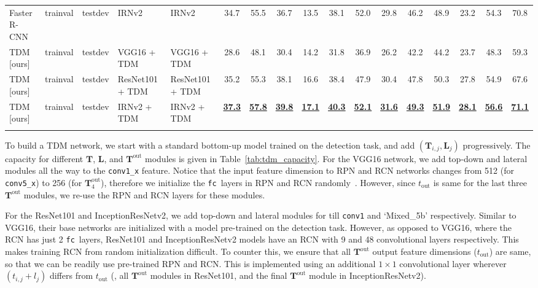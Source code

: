 \documentclass[10pt,twocolumn,letterpaper]{article}
\newcommand{\vv}[1]{{\texttt{#1}}}
\newcommand{\conv}{\vv{conv}}
\newcommand{\fc}{\vv{fc}}
\newcommand{\hl}[1]{\underline{\textbf{#1}}}
\begin{document}
\begin{table*}[th]
{\begin{tabular}{
@{}o{2.7cm} o{1.3cm} o{1.3cm} o{2.5cm} o{2.5cm} 
!{\color{gray}\vrule} ccc
!{\color{gray}\vrule} ccc
!{\color{gray}\vrule} ccc
!{\color{gray}\vrule} ccc
@{}}
Faster R-CNN & trainval\raisebox{0.2ex}{$\ast$} & testdev & IRNv2 & IRNv2 & 34.7 & 55.5 & 36.7 & 13.5 & 38.1 & 52.0 & 29.8 & 46.2 & 48.9 & 23.2 & 54.3 & 70.8 \\
\Xhline{1pt}
TDM [ours]  & trainval\raisebox{0.2ex}{$\ast$} & testdev & VGG16 + TDM & VGG16 + TDM & 28.6 &  48.1 &  30.4 &  14.2 &  31.8 &  36.9 &  26.2 &  42.2 &  44.2 &  23.7 &  48.3 &  59.3 \\
TDM [ours]  & trainval\raisebox{0.2ex}{$\ast$} & testdev & ResNet101 + TDM & ResNet101 + TDM & 35.2 & 55.3 & 38.1 & 16.6 & 38.4 & 47.9 & 30.4 & 47.8 & 50.3 & 27.8 & 54.9 & 67.6 \\
TDM [ours]  & trainval\raisebox{0.2ex}{$\ast$} & testdev & IRNv2 + TDM & IRNv2 + TDM & \hl{37.3} & \hl{57.8} & \hl{39.8} & \hl{17.1} & \hl{40.3} & \hl{52.1} & \hl{31.6} & \hl{49.3} & \hl{51.9} & \hl{28.1} & \hl{56.6} & \hl{71.1} \\
\Xhline{1pt}
\end{tabular}
}
\vspace{-0.11in}
\label{tab:coco_pref}
\end{table*}


To build a TDM network, we start with a standard bottom-up model trained on the detection task, and add $\left(\mathbf{T}_{i,j}, \mathbf{L}_j\right)$ progressively. The capacity for different $\mathbf{T}$, $\mathbf{L}$, and $\mathbf{T}^\text{out}$ modules is given in Table~\ref{tab:tdm_capacity}. For the VGG16 network, we add top-down and lateral modules all the way to the \conv\verb|1_x| feature. Notice that the input feature dimension to RPN and RCN networks changes from 512 (for \conv\verb|5_x|) to 256 (for $\mathbf{T}^\text{out}_{4}$), therefore we initialize the \fc\ layers in RPN and RCN randomly~\cite{xavier}. However, since $t_\text{out}$ is same for the last three $\mathbf{T}^\text{out}$ modules, we re-use the RPN and RCN layers for these modules.

For the ResNet101 and InceptionResNetv2, we add top-down and lateral modules for till \conv\verb|1| and `Mixed\_5b' respectively. Similar to VGG16, their base networks are initialized with a model pre-trained on the detection task. However, as opposed to VGG16, where the RCN has just 2 \fc\ layers, ResNet101 and InceptionResNetv2 models have an RCN with 9 and 48 convolutional layers respectively. This makes training RCN from random initialization difficult. To counter this, we ensure that all $\mathbf{T}^\text{out}$ output feature dimensions ($t_\text{out}$) are same, so that we can be readily use pre-trained RPN and RCN. This is implemented using an additional $1\times1$ convolutional layer wherever $\left(t_{i,j}+l_j\right)$ differs from $t_\text{out}$ (\eg, all $\mathbf{T}^\text{out}$ modules in ResNet101, and the final $\mathbf{T}^\text{out}$ module in InceptionResNetv2).
\end{document}
